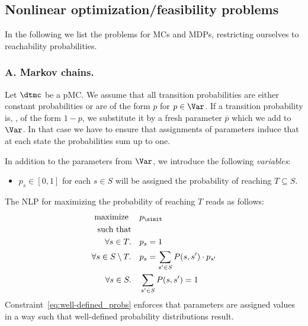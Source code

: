 		
\subsection{Nonlinear optimization/feasibility problems}
In the following we list the problems for MCs and MDPs, restricting ourselves to reachability probabilities.
\subsubsection{A. Markov chains.}
Let $\dtmc$ be a pMC. We assume that all transition probabilities are either constant probabilities or are of the form $p$ for $p\in\Var$. If a transition probability is, \eg, of the form $1-p$, we substitute it by a fresh parameter $\overline p$ which we add to $\Var$. In that case we have to ensure that assignments of parameters induce that at each state the probabilities sum up to one.

In addition to the parameters from $\Var$, we introduce the following \emph{variables}:
		\begin{itemize}
			\item $p_s\in[0,1]$ for each $s\in S$ will be assigned the probability of reaching $T\subseteq S$.
		\end{itemize}
	 	The NLP for maximizing the probability of reaching $T$ reads as follows:
		\begin{align}
			\text{maximize } &\quad p_{\sinit}\label{eq:min}\\
			\text{such that}\\
			\forall s\in T.	 &\quad p_s=1\label{eq:targetprob}\\
			\forall s\in S\setminus T.	&\quad p_s = \sum_{s'\in S}	P(s,s')\cdot p_{s'}\label{eq:probcomputation}\\
			\forall s\in S.	 &\quad \sum_{s'\in S}P(s,s')=1\label{eq:well-defined_probs}
		\end{align}
		Constraint~\ref{eq:well-defined_probs} enforces that parameters are assigned values in a way such that well-defined probability distributions result. 
		
